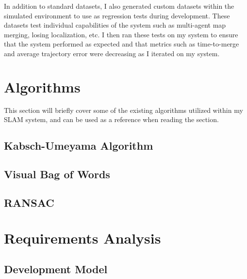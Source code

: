 In addition to standard datasets, I also generated custom datasets within the simulated environment to use as regression tests during development. These datasets test individual capabilities of the system such as multi-agent map merging, losing localization, etc. I then ran these tests on my system to ensure that the system performed as expected and that metrics such as time-to-merge and average trajectory error were decreasing as I iterated on my system.

\section{Algorithms}
\label{sec:algorithms}
This section will briefly cover some of the existing algorithms utilized within my SLAM system, and can be used as a reference when reading the  section.

\subsection{Kabsch-Umeyama Algorithm}
\label{sec:kabsch-umeyama-algorithm}

\subsection{Visual Bag of Words}
\label{sec:visual-bag-of-words}

\subsection{RANSAC}
\label{sec:ransac}

\section{Requirements Analysis}
\label{sec:requirements-analysis}

\subsection{Development Model}
\label{sec:development-model}

